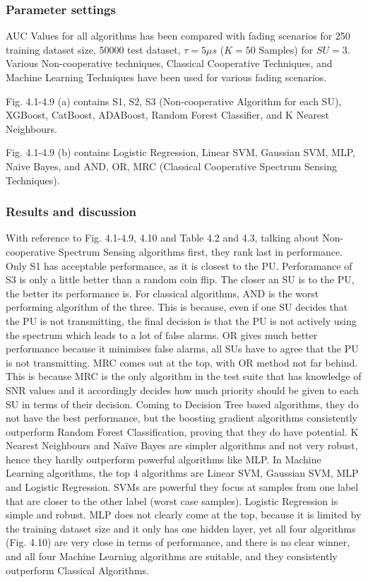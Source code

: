 \subsubsection{Parameter settings}
AUC Values for all algorithms has been compared with fading scenarios for 250 training dataset size, 50000 test dataset, $\tau=5\mu s$ ($K=50$ Samples) for $SU=3$. Various Non-cooperative techniques, Classical Cooperative Techniques, and Machine Learning Techniques have been used for various fading scenarios.

Fig. 4.1-4.9 (a) contains S1, S2, S3 (Non-cooperative Algorithm for each SU), XGBoost, CatBoost, ADABoost, Random Forest Classifier, and K Nearest Neighbours.

Fig. 4.1-4.9 (b) contains Logistic Regression, Linear SVM, Gaussian SVM, MLP, Naive Bayes, and AND, OR, MRC (Classical Cooperative Spectrum Sensing Techniques).
\subsubsection{Results and discussion}
With reference to Fig. 4.1-4.9, 4.10 and Table 4.2 and 4.3, talking about Non-cooperative Spectrum Sensing algorithms first, they rank last in performance. Only S1 has acceptable performance, as it is closest to the PU. Perforamance of S3 is only a little better than a random coin flip. The closer an SU is to the PU, the better its performance is. For classical algorithms, AND is the worst performing algorithm of the three. This is because, even if one SU decides that the PU is not transmitting, the final decision is that the PU is not actively using the spectrum which leads to a lot of false alarms. OR gives much better performance because it minimises false alarms, all SUs have to agree that the PU is not transmitting. MRC comes out at the top, with OR method not far behind. This is because MRC is the only algorithm in the test suite that has knowledge of SNR values and it accordingly decides how much priority should be given to each SU in terms of their decision. 
Coming to Decision Tree based algorithms, they do not have the best performance, but the boosting gradient algorithms consistently outperform Random Forest Classification, proving that they do have potential. K Nearest Neighbours and Naïve Bayes are simpler algorithms and not very robust, hence they hardly outperform powerful algorithms like MLP. In Machine Learning algorithms, the top 4 algorithms are Linear SVM, Gaussian SVM, MLP and Logistic Regression. SVMs are powerful they focus at samples from one label that are closer to the other label (worst case samples). Logistic Regression is simple and robust. MLP does not clearly come at the top, because it is limited by the training dataset size and it only has one hidden layer, yet all four algorithms (Fig. 4.10) are very close in terms of performance, and there is no clear winner, and all four Machine Learning algorithms are suitable, and they consistently outperform Classical Algorithms.


